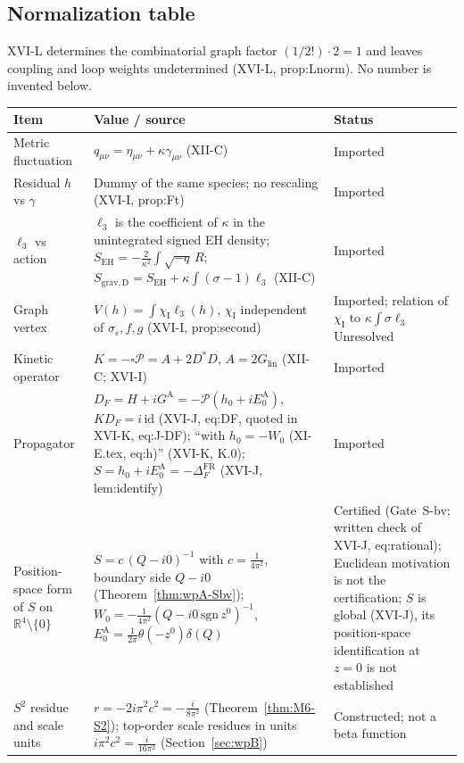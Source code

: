 \documentclass{article}
\theoremstyle{remark}
\newcommand{\Pc}{\mathcal P}
\newcommand{\sigeps}{\sigma_\varepsilon}
\newcommand{\chiI}{\chi_{\mathrm I}}
\begin{document}
\subsection{Normalization table}
\label{sec:m0norm}

XVI-L determines the combinatorial graph factor $(1/2!)\cdot2=1$ and leaves coupling and loop weights undetermined (XVI-L, prop:Lnorm).
No number is invented below.

\begin{center}
\begin{longtable}{p{}p{}p{}}
\hline
Item & Value / source & Status\\
\hline
Metric fluctuation & $q_{\mu\nu}=\eta_{\mu\nu}+\kappa\gamma_{\mu\nu}$ (XII-C) & Imported\\
Residual $h$ vs $\gamma$ & Dummy of the same species; no rescaling (XVI-I, prop:Ft) & Imported\\
$\ell_3$ vs action & $\ell_3$ is the coefficient of $\kappa$ in the unintegrated signed EH density; $S_{\mathrm{EH}}=-\frac2{\kappa^2}\int\sqrt{-q}\,R$; $S_{\mathrm{grav,D}}=S_{\mathrm{EH}}+\kappa\int(\sigma-1)\ell_3$ (XII-C) & Imported\\
Graph vertex & $V(h)=\int\chiI\ell_3(h)$, $\chiI$ independent of $\sigeps,f,g$ (XVI-I, prop:second) & Imported; relation of $\chiI$ to $\kappa\int\sigma\ell_3$ Unresolved\\
Kinetic operator & $K=-\square\Pc=A+2D^*D$, $A=2G_{\mathrm{lin}}$ (XII-C; XVI-I) & Imported\\
Propagator & $D_F=H+iG^{\mathrm A}=-\Pc(h_0+iE_0^{\mathrm A})$, $KD_F=i\,\mathrm{id}$ (XVI-J, eq:DF, quoted in XVI-K, eq:J-DF); ``with $h_0=-W_0$ (XI-E.tex, eq:h)'' (XVI-K, K.0); $S=h_0+iE_0^{\mathrm A}=-\Delta_F^{\mathrm{FR}}$ (XVI-J, lem:identify) & Imported\\
Position-space form of $S$ on $\mathbb R^4\setminus\{0\}$ & $S=c\,(Q-i0)^{-1}$ with $c=\frac1{4\pi^2}$, boundary side $Q-i0$ (Theorem~\ref{thm:wpA-Sbv}); $W_0=-\frac1{4\pi^2}(Q-i0\,\mathrm{sgn}\,z^0)^{-1}$, $E_0^{\mathrm A}=\frac1{2\pi}\theta(-z^0)\delta(Q)$ & Certified (Gate~S-bv; written check of XVI-J, eq:rational); Euclidean motivation is not the certification; $S$ is global (XVI-J), its position-space identification at $z=0$ is not established\\
$S^2$ residue and scale units & $r=-2i\pi^2c^2=-\frac{i}{8\pi^2}$ (Theorem~\ref{thm:M6-S2}); top-order scale residues in units $i\pi^2c^2=\frac{i}{16\pi^2}$ (Section~\ref{sec:wpB}) & Constructed; not a beta function\\

\end{longtable}
\end{center}
\end{document}
